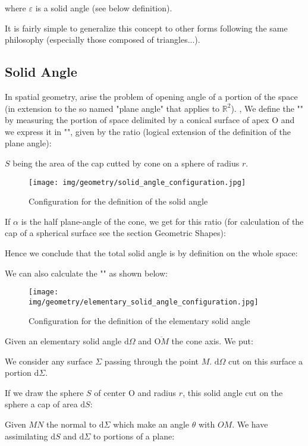 	where $\varepsilon$ is a solid angle (see below definition).
	
	It is fairly simple to generalize this concept to other forms following the same philosophy (especially those composed of triangles...).
	
	\subsection{Solid Angle}\label{solid angle}
	In spatial geometry, arise the problem of opening angle of a portion of the space (in extension to the so named "plane angle" that applies to $\mathbb{R}^2$). , We define the "" by measuring the portion of space delimited by a conical surface of apex $\text{O}$ and we express it in "", given by the ratio (logical extension of the definition of the plane angle):
	
	$S$ being the area of the cap cutted by cone on a sphere of radius $r$.
	
	\begin{figure}[H]
		\centering
		\texttt{[image: img/geometry/solid\_angle\_configuration.jpg]}
		\caption{Configuration for the definition of the solid angle}
	\end{figure}
	If $\alpha$ is the half plane-angle of the cone, we get for this ratio (for calculation of the cap of a spherical surface see the section Geometric Shapes):
	
	Hence we conclude that the total solid angle is by definition on the whole space:
	
	We can also calculate the "" as shown below:
	\begin{figure}[H]
		\centering
		\texttt{[image: img/geometry/elementary\_solid\_angle\_configuration.jpg]}
		\caption{Configuration for the definition of the elementary solid angle}
	\end{figure}
	Given an elementary solid angle $\mathrm{d}\Omega$ and $\overline{\text{O}M}$ the cone axis. We put:
	
	We consider any surface $\Sigma$ passing through the point $M$. $\mathrm{d}\Omega$ cut on this surface a portion $\mathrm{d}\Sigma$.
	
	If we draw the sphere $S$ of center $\text{O}$ and radius $r$, this solid angle cut on the sphere a cap of area $\mathrm{d}S$:
	
	Given $MN$ the normal to $\mathrm{d}\Sigma$ which make an angle $\theta$ with $OM$. We have assimilating $\mathrm{d}S$ and $\mathrm{d}\Sigma$ to portions of a plane:
	
